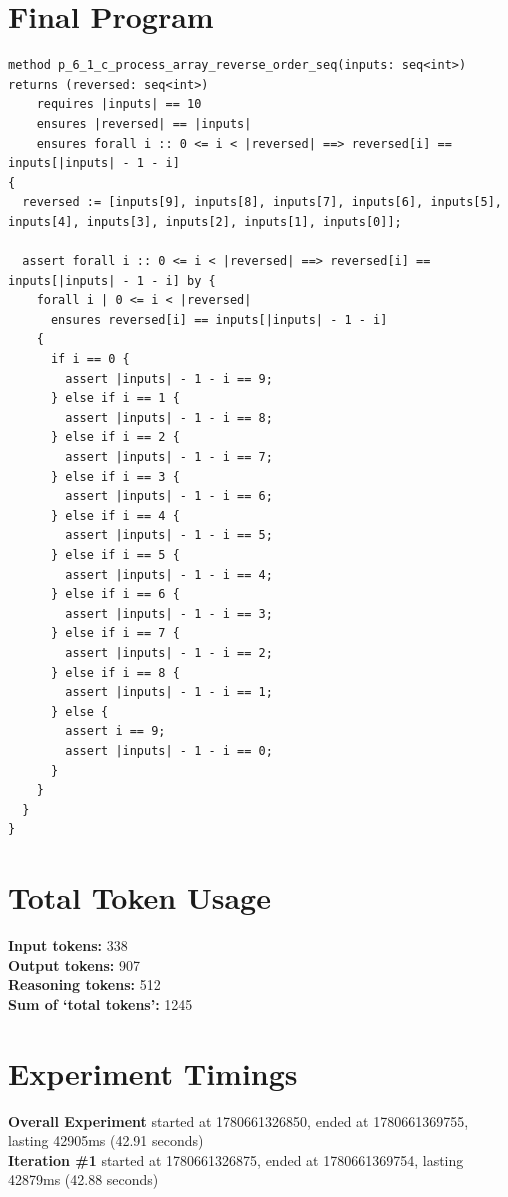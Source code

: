 \documentclass{article}
\begin{document}
\section*{Final Program}
\begin{lstlisting}
method p_6_1_c_process_array_reverse_order_seq(inputs: seq<int>) returns (reversed: seq<int>)
	requires |inputs| == 10
	ensures |reversed| == |inputs|
	ensures forall i :: 0 <= i < |reversed| ==> reversed[i] == inputs[|inputs| - 1 - i]
{
  reversed := [inputs[9], inputs[8], inputs[7], inputs[6], inputs[5], inputs[4], inputs[3], inputs[2], inputs[1], inputs[0]];

  assert forall i :: 0 <= i < |reversed| ==> reversed[i] == inputs[|inputs| - 1 - i] by {
    forall i | 0 <= i < |reversed|
      ensures reversed[i] == inputs[|inputs| - 1 - i]
    {
      if i == 0 {
        assert |inputs| - 1 - i == 9;
      } else if i == 1 {
        assert |inputs| - 1 - i == 8;
      } else if i == 2 {
        assert |inputs| - 1 - i == 7;
      } else if i == 3 {
        assert |inputs| - 1 - i == 6;
      } else if i == 4 {
        assert |inputs| - 1 - i == 5;
      } else if i == 5 {
        assert |inputs| - 1 - i == 4;
      } else if i == 6 {
        assert |inputs| - 1 - i == 3;
      } else if i == 7 {
        assert |inputs| - 1 - i == 2;
      } else if i == 8 {
        assert |inputs| - 1 - i == 1;
      } else {
        assert i == 9;
        assert |inputs| - 1 - i == 0;
      }
    }
  }
}
\end{lstlisting}
\section*{Total Token Usage}
\textbf{Input tokens: }338
\\\textbf{Output tokens: }907
\\\textbf{Reasoning tokens: }512
\\\textbf{Sum of `total tokens': }1245
\section*{Experiment Timings}
\textbf{Overall Experiment} started at 1780661326850, ended at 1780661369755, lasting 42905ms (42.91 seconds)
\\\textbf{Iteration \#1} started at 1780661326875, ended at 1780661369754, lasting 42879ms (42.88 seconds)
\end{document}
